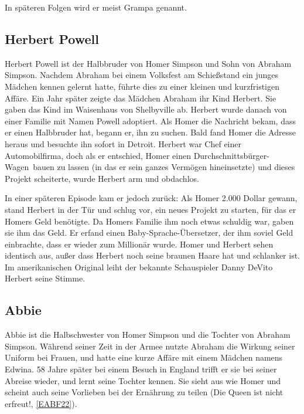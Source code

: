 In späteren Folgen wird er meist Grampa genannt.


\subsection{Herbert Powell}
Herbert Powell ist der Halbbruder von Homer Simpson und Sohn von Abraham Simpson. Nachdem Abraham bei einem Volksfest am Schießstand ein junges Mädchen kennen gelernt hatte, führte dies zu einer kleinen und kurzfristigen Affäre. Ein Jahr später zeigte das Mädchen Abraham ihr Kind Herbert. Sie gaben das Kind im Waisenhaus von Shelbyville ab. Herbert wurde danach von einer Familie mit Namen Powell adoptiert. Als Homer die Nachricht bekam, dass er einen Halbbruder hat, begann er, ihn zu suchen. Bald fand Homer die Adresse heraus und besuchte ihn sofort in Detroit. Herbert war Chef einer Automobilfirma, doch als er entschied, Homer einen \glqq Durchschnittsbürger-Wagen\grqq\ bauen zu lassen (in das er sein ganzes Vermögen hineinsetzte) und dieses Projekt scheiterte, wurde Herbert arm und obdachlos.

In einer späteren Episode kam er jedoch zurück: Als Homer 2.000 Dollar gewann, stand Herbert in der Tür und schlug vor, ein neues Projekt zu starten, für das er Homers Geld benötigte. Da Homers Familie ihm noch etwas schuldig war, gaben sie ihm das Geld. Er erfand einen \glqq Baby-Sprache-Übersetzer\grqq , der ihm soviel Geld einbrachte, dass er wieder zum Millionär wurde. Homer und Herbert sehen identisch aus, außer dass Herbert noch seine braunen Haare hat und schlanker ist. Im amerikanischen Original leiht der bekannte Schauspieler Danny DeVito Herbert seine Stimme.


\subsection{Abbie}
Abbie ist die Halbschwester von Homer Simpson und die Tochter von Abraham Simpson. Während seiner Zeit in der Armee nutzte Abraham die Wirkung seiner Uniform bei Frauen, und hatte eine kurze Affäre mit einem Mädchen namens Edwina. 58 Jahre später bei einem Besuch in England trifft er sie bei seiner Abreise wieder, und lernt seine Tochter kennen. Sie sieht aus wie Homer und scheint auch seine Vorlieben bei der Ernährung zu teilen (\glqq Die Queen ist nicht erfreut!\grqq , \ref{EABF22}).


